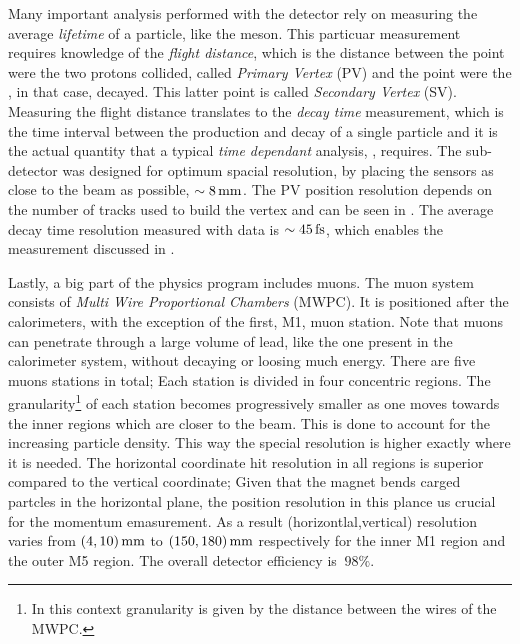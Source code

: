 Many important analysis performed with the \lhcb detector rely on measuring the average {\it lifetime} of a particle,
like the \Bs meson. This particuar measurement requires knowledge of the {\it flight distance}, which is the
distance between the point were the two protons collided, called {\it Primary Vertex} (PV) and the point were the
\Bs, in that case, decayed. This latter point is called {\it Secondary Vertex} (SV). Measuring the flight distance
translates to the {\it decay time} measurement, which is the time interval between the production and decay of a
single particle and it is the actual quantity that a typical {\it time dependant} analysis, \eg \BsJpsiPhi, requires.
The \velo sub-detector was designed for optimum spacial resolution, by placing the \velo sensors as close to the beam
as possible, $\sim 8 \rm \,mm$. The PV position resolution depends on the number of tracks used to build the vertex and can
be seen in . The average decay time resolution measured with \BsJpsiPhi data is $\sim 45\rm \,fs$,
which enables the \phis measurement discussed in .

Lastly, a big part of the \lhcb physics program includes muons. The muon system consists of {\it Multi Wire Proportional Chambers}
(MWPC). It is positioned after the calorimeters, with the exception of the first, M1, muon station.
Note that muons can penetrate through a large volume of lead, like the one present in the calorimeter system,
without decaying or loosing much energy. There are five muons stations in total; Each station is divided in four concentric
regions. The granularity\footnote{In this context granularity is given by the distance between the wires of the MWPC.}
of each station becomes progressively smaller as one moves towards the inner regions which are closer to the beam.
This is done to account for the increasing particle density. This way the special resolution is higher exactly where
it is needed. The horizontal coordinate hit resolution in all regions is superior compared to the vertical coordinate;
Given that the \lhcb magnet bends carged partcles in the horizontal plane, the position resolution in this plance
us crucial for the momentum emasurement. As a result (horizontlal,vertical) resolution varies from $(4,10)\rm \,mm$ to
$(150,180)\rm \,mm$ respectively for the inner M1 region and the outer M5 region. The overall detector efficiency is $\>98\%$.
